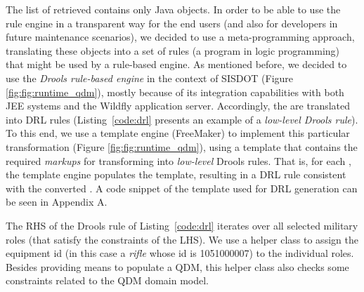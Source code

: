 


The list of retrieved \callers contains only Java objects. 
In order to be able to use the rule engine in a transparent way for the end users 
(and also for developers in future maintenance scenarios), we decided to use a 
meta-programming approach, translating these objects into a set of rules (a program in 
logic programming) that might be used by a rule-based engine. As mentioned before,  
we decided to use the \emph{Drools rule-based engine} in the context of 
SISDOT (Figure \ref{fig:fig:runtime_qdm}), mostly because of its integration capabilities 
with both JEE systems and the Wildfly application server. Accordingly,  
the \callers are translated into DRL rules (Listing~\ref{code:drl} presents an
example of a \emph{low-level Drools rule}). To this end, we use a template engine (FreeMaker) 
to implement this particular transformation (Figure \ref{fig:fig:runtime_qdm}), using a template 
that contains the required \emph{markups} for transforming \shc into \emph{low-level} Drools 
rules. That is, for each \shc, the template engine populates the template, 
resulting in a DRL rule consistent with the converted \shc.
A code snippet of the template used for DRL generation can be seen in Appendix A. 

The RHS of the Drools rule of Listing~\ref{code:drl}
iterates over all selected military roles (that satisfy
the constraints of the LHS). We use a helper class to
assign the equipment id (in this case a \emph{rifle} whose id is
1051000007) to the individual roles. Besides providing
means to populate a QDM, this helper class also checks
some constraints related to the QDM domain model. 


